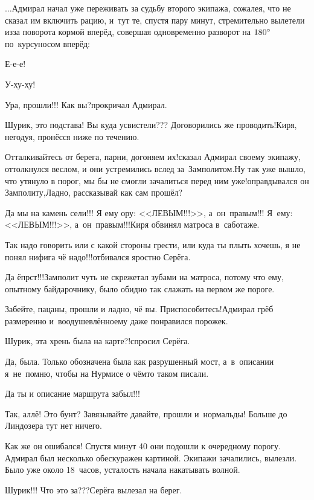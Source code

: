 $\ldots$Адмирал начал уже переживать за судьбу второго экипажа, сожалея, что не сказал им включить рацию, и~тут те, спустя пару минут, стремительно вылетели из\sdash за поворота кормой вперёд, совершая одновременно разворот на $180\degree$ по~курсу\mdash носом вперёд:

\diagdash Е-е-е!

\diagdash У-ху-ху!

\diagdash Ура, прошли!!! Как вы?\mdash прокричал Адмирал.

\diagdash Шурик, это подстава! Вы куда усвистели??? Договорились же проводить!\mdash Киря, негодуя, пронёсся ниже по течению.

\diagdash Отталкивайтесь от берега, парни, догоняем их!\mdash сказал Адмирал своему экипажу, оттолкнулся веслом, и они устремились вслед за~Замполитом.\mdash Ну так уже вышло, что утянуло в порог, мы бы не смогли зачалиться перед ним уже!\mdash оправдывался он Замполиту,\mdash Ладно, рассказывай как сам прошёл?

\diagdash Да мы на камень сели!!! Я ему ору: <<ЛЕВЫМ!!!>>, а~он~правым!!! Я~ему: <<ЛЕВЫМ!!!>>, а~он~правым!!!\mdash Киря обвинял матроса в~саботаже.

\diagdash Так надо говорить или с какой стороны грести, или куда ты плыть хочешь, я не понял нифига чё надо!!!\mdash отбивался яростно Серёга.

\diagdash Да ёпрст!!!\mdash Замполит чуть не скрежетал зубами на матроса, потому что ему, опытному байдарочнику, было обидно так слажать на первом же пороге.

\diagdash Забейте, пацаны, прошли и ладно, чё вы. Приспособитесь!\mdash Адмирал грёб размеренно и~воодушевлённо\mdash ему даже понравился порожек.

\diagdash Шурик, эта хрень была на карте?!\mdash спросил Серёга.

\diagdash Да, была. Только обозначена была как разрушенный мост, а~в~описании я~не~помню, чтобы на Нурмисе о чём\sdash то таком писали.

\diagdash Да ты и описание маршрута забыл!!!

\diagdash Так, аллё! Это бунт? Завязывайте давайте, прошли и~нормальды! Больше до Линдозера тут нет ничего.

Как же он ошибался! Спустя минут 40 они подошли к очередному порогу. Адмирал был несколько обескуражен картиной. Экипажи зачалились, вылезли. Было уже около 18~часов, усталость начала накатывать волной.

\diagdash Шурик!!! Что это за???\mdash Серёга вылезал на берег.

